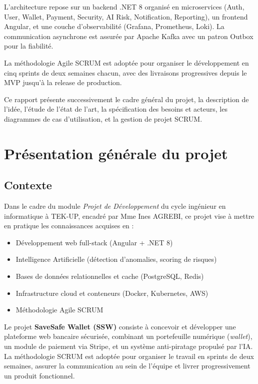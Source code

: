 \documentclass[12pt,a4paper]{report}
\begin{document}
L'architecture repose sur un backend .NET 8 organisé en microservices (Auth, User, Wallet, Payment, Security, AI Risk, Notification, Reporting), un frontend Angular, et une couche d'observabilité (Grafana, Prometheus, Loki). La communication asynchrone est assurée par Apache Kafka avec un patron Outbox pour la fiabilité.

La méthodologie Agile SCRUM est adoptée pour organiser le développement en cinq sprints de deux semaines chacun, avec des livraisons progressives depuis le MVP jusqu'à la release de production.

Ce rapport présente successivement le cadre général du projet, la description de l'idée, l'étude de l'état de l'art, la spécification des besoins et acteurs, les diagrammes de cas d'utilisation, et la gestion de projet SCRUM.

\newpage

\chapter{Présentation générale du projet}

\section{Contexte}
Dans le cadre du module \textit{Projet de Développement} du cycle ingénieur en informatique à TEK-UP, encadré par Mme Ines AGREBI, ce projet vise à mettre en pratique les connaissances acquises en :
\begin{itemize}[leftmargin=*,label=--]
\item Développement web full-stack (Angular + .NET 8)
\item Intelligence Artificielle (détection d'anomalies, scoring de risques)
\item Bases de données relationnelles et cache (PostgreSQL, Redis)
\item Infrastructure cloud et conteneurs (Docker, Kubernetes, AWS)
\item Méthodologie Agile SCRUM
\end{itemize}

Le projet \textbf{SaveSafe Wallet (SSW)} consiste à concevoir et développer une plateforme web bancaire sécurisée, combinant un portefeuille numérique (\textit{wallet}), un module de paiement via Stripe, et un système anti-piratage propulsé par l'IA. La méthodologie SCRUM est adoptée pour organiser le travail en sprints de deux semaines, assurer la communication au sein de l'équipe et livrer progressivement un produit fonctionnel.
\end{document}
